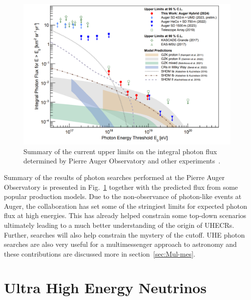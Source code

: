 \begin{figure}[t!]
  \centering
  \includegraphics[width=14.5cm]{thesis_figures/CRnNu/Photon-limits.png}
  \caption{Summary of the current upper limits on the integral photon flux determined by Pierre Auger Observatory and other experiments~\cite{PierreAuger:2024ayl}.}
  \label{fig:Auger-Photon-limits}
\end{figure}

Summary of the results of photon searches performed at the Pierre Auger Observatory is presented in Fig.~\ref{fig:Auger-Photon-limits} together with the predicted flux from some popular production models. Due to the non-observance of photon-like events at Auger, the collaboration has set some of the stringiest limits for expected photon flux at high energies. This has already helped constrain some top-down scenarios ultimately leading to a much better understanding of the origin of \glspl{UHECR}. Further, searches will also help constrain the mystery of the cutoff. UHE photon searches are also very useful for a multimessenger approach to astronomy and these contributions are discussed more in section~\ref{sec:Mul-mes}.


\section{Ultra High Energy Neutrinos}
\label{sec:UHENu}
